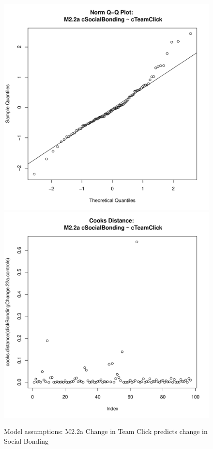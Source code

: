 {\begin{figure}[htbp]
        \includegraphics[scale =.4]{images/MLM22aQQNorm.pdf}
        \includegraphics[scale =.4]{images/MLM22aCooksD.pdf}
        \caption{Model assumptions: M2.2a Change in Team Click predicts change in Social Bonding}
        \label{fig:MLM22aAssumptions}
      \end{figure}







}
